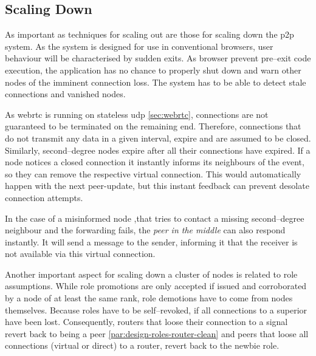 \subsection{Scaling Down}
As important as techniques for scaling out are those for scaling down the \gls{p2p} system. As the system is designed for use in conventional browsers, user behaviour will be characterised by sudden exits. As browser prevent pre–exit code execution, the application has no chance to properly shut down and warn other nodes of the imminent connection loss. The system has to be able to detect stale connections and vanished nodes.

As \gls{webrtc} is running on stateless \gls{udp} \cref{sec:webrtc}, connections are not guaranteed to be terminated on the remaining end.
Therefore, connections that do not transmit any data in a given interval, expire and are assumed to be closed. Similarly, second–degree nodes expire after all their connections have expired.
If a node notices a closed connection it instantly informs its neighbours of the event, so they can remove the respective virtual connection. This would automatically happen with the next \gls{peer-update}, but this instant feedback can prevent desolate connection attempts.

In the case of a misinformed node ,that tries to contact a missing second–degree neighbour and the forwarding fails, the \textit{peer in the middle} can also respond instantly. It will send a message to the sender, informing it that the receiver is not available via this virtual connection.

Another important aspect for scaling down a cluster of nodes is related to role assumptions. While role promotions are only accepted if issued and corroborated by a node of at least the same rank, role demotions have to come from nodes themselves.
Because roles have to be self–revoked, if all connections to a superior have been lost. Consequently, routers that loose their connection to a signal revert back to being a peer \cref{par:design-roles-router-clean} and peers that loose all connections (virtual or direct) to a router, revert back to the newbie role.
